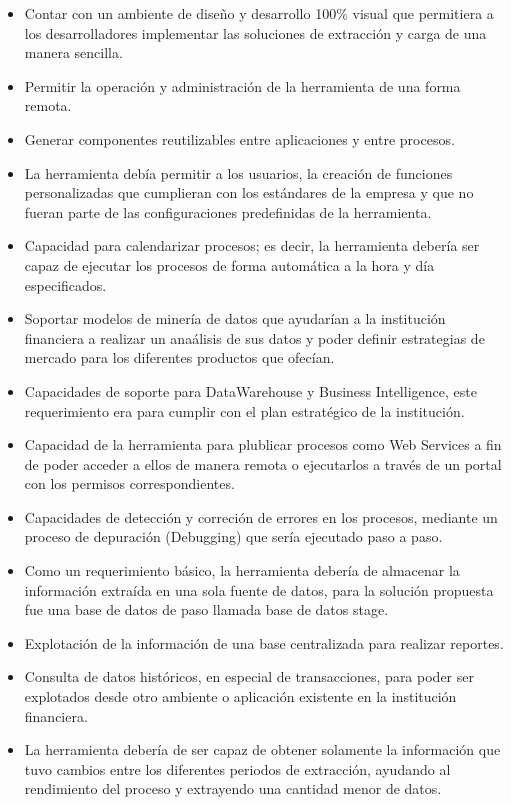 \documentclass[a4paper,openright,12pt]{book}
\begin{document}
\begin{itemize}
\item Contar con un ambiente de diseño y desarrollo 100\% visual que permitiera a los desarrolladores implementar las soluciones de extracción y carga de una manera sencilla.
\item Permitir la operación y administración de la herramienta de una forma remota.
\item Generar componentes reutilizables entre aplicaciones y entre procesos.
\item La herramienta debía permitir a los usuarios, la creación de funciones personalizadas que cumplieran con los estándares de la empresa y que no fueran parte de las configuraciones predefinidas de la herramienta.
\item Capacidad para calendarizar procesos; es decir, la herramienta debería ser capaz de ejecutar los procesos de forma automática a la hora y día especificados.
\item Soportar modelos de minería de datos que ayudarían  a la institución financiera a realizar un anaálisis de sus datos y poder definir estrategias de mercado para los diferentes productos que ofecían.
\item Capacidades de soporte para DataWarehouse y Business Intelligence, este requerimiento era para cumplir con el plan estratégico de la institución. 
\item Capacidad de la herramienta para plublicar procesos como Web Services a fin de poder acceder a ellos de manera remota o ejecutarlos a través de un portal con los permisos correspondientes. 
\item Capacidades de detección y correción de errores en los procesos, mediante un proceso de depuración (Debugging) que sería ejecutado paso a paso.
\item Como un requerimiento básico, la herramienta debería de almacenar la información extraída en una sola fuente de datos, para la solución propuesta fue una base de datos de paso llamada base de datos stage.
\item Explotación de la información de una base centralizada para realizar reportes.
\item Consulta de datos históricos, en especial de transacciones, para poder ser explotados desde otro ambiente o aplicación existente en la institución financiera.
\item La herramienta debería de ser capaz de obtener solamente la información que tuvo cambios entre los diferentes periodos de extracción, ayudando al rendimiento del proceso y extrayendo una cantidad menor de datos.
\end{itemize} 
\end{document}
